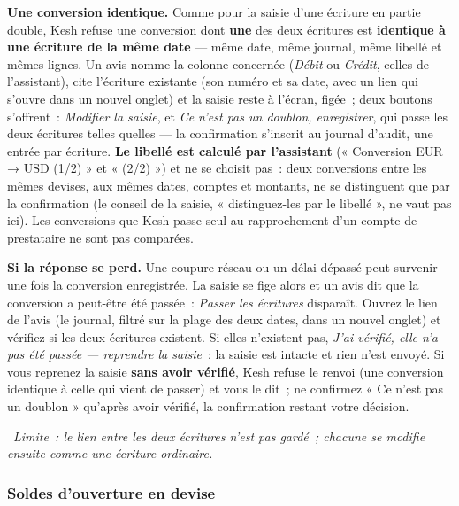 \documentclass[a4paper,11pt,oneside]{article}
\begin{document}
\textbf{Une conversion identique.} Comme pour la saisie d'une écriture en partie double, Kesh refuse une conversion dont \textbf{une} des deux écritures est \textbf{identique à une écriture de la même date} --- même date, même journal, même libellé et mêmes lignes. Un avis nomme la colonne concernée (\emph{Débit} ou \emph{Crédit}, celles de l'assistant), cite l'écriture existante (son numéro et sa date, avec un lien qui s'ouvre dans un nouvel onglet) et la saisie reste à l'écran, figée~; deux boutons s'offrent~: \emph{Modifier la saisie}, et \emph{Ce n'est pas un doublon, enregistrer}, qui passe les deux écritures telles quelles --- la confirmation s'inscrit au journal d'audit, une entrée par écriture. \textbf{Le libellé est calculé par l'assistant} (« Conversion EUR → USD (1/2) » et « (2/2) ») et ne se choisit pas~: deux conversions entre les mêmes devises, aux mêmes dates, comptes et montants, ne se distinguent que par la confirmation (le conseil de la saisie, « distinguez-les par le libellé », ne vaut pas ici). Les conversions que Kesh passe seul au rapprochement d'un compte de prestataire ne sont pas comparées.

\textbf{Si la réponse se perd.} Une coupure réseau ou un délai dépassé peut survenir une fois la conversion enregistrée. La saisie se fige alors et un avis dit que la conversion a peut-être été passée~: \emph{Passer les écritures} disparaît. Ouvrez le lien de l'avis (le journal, filtré sur la plage des deux dates, dans un nouvel onglet) et vérifiez si les deux écritures existent. Si elles n'existent pas, \emph{J'ai vérifié, elle n'a pas été passée --- reprendre la saisie}~: la saisie est intacte et rien n'est envoyé. Si vous reprenez la saisie \textbf{sans avoir vérifié}, Kesh refuse le renvoi (une conversion identique à celle qui vient de passer) et vous le dit~; ne confirmez « Ce n'est pas un doublon » qu'après avoir vérifié, la confirmation restant votre décision.

\keshAttention\ \emph{Limite~: le lien entre les deux écritures n'est pas gardé~; chacune se modifie ensuite comme une écriture ordinaire.}

\subsubsection{Soldes d'ouverture en devise}
\end{document}
